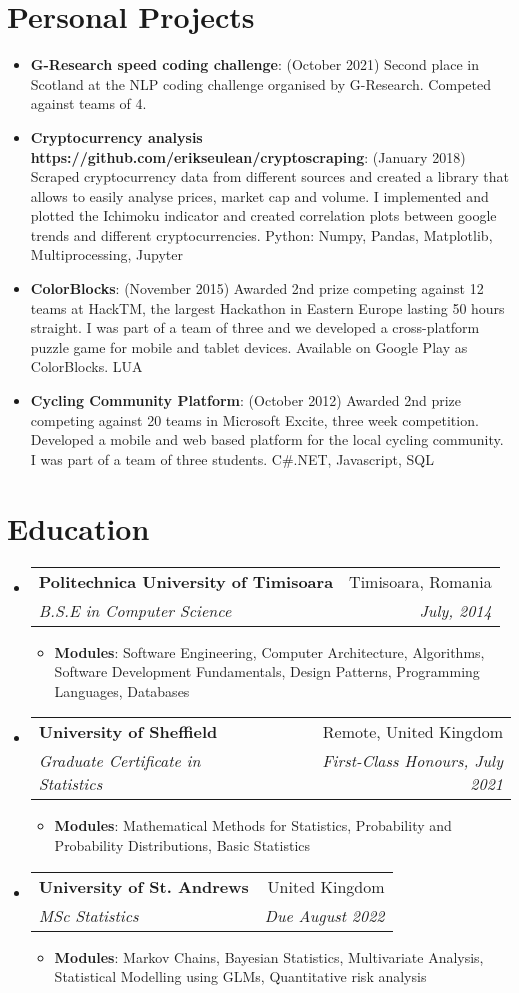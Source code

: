\documentclass[letterpaper,11pt]{article}
\makeatletter
\newcommand{\resumeItem}[2]{
  \item\small{
    \textbf{#1}{: #2 \vspace{-1pt}}
  }
}
\newcommand{\resumeSubheading}[4]{
  \vspace{-1pt}\item
    \begin{tabular*}{0.97\textwidth}{l@{\extracolsep{\fill}}r}
      \textbf{#1} & #2 \\
      \textit{\small#3} & \textit{\small #4} \\
    \end{tabular*}\vspace{-5pt}
}
\newcommand{\resumeSubItem}[2]{\resumeItem{#1}{#2}\vspace{-5pt}}
\newcommand{\resumeSubHeadingListStart}{\begin{itemize}[leftmargin=*]}
\newcommand{\resumeSubHeadingListEnd}{\end{itemize}}
\newcommand{\resumeItemListStart}{\begin{itemize}}
\newcommand{\resumeItemListEnd}{\end{itemize}\vspace{-4.6pt}}
\makeatother
\begin{document}
\section{Personal Projects}
  \resumeSubHeadingListStart
    \resumeSubItem {G-Research speed coding challenge}
    {(October 2021) Second place in Scotland at the NLP coding challenge organised by G-Research. Competed against teams of 4.}
    \resumeSubItem {Cryptocurrency analysis https://github.com/erikseulean/cryptoscraping}
    {(January 2018) Scraped cryptocurrency data from different sources and created a library that allows to easily analyse prices, market cap and volume. I implemented and plotted the Ichimoku indicator and created correlation plots between google trends and different cryptocurrencies. Python: Numpy, Pandas, Matplotlib, Multiprocessing, Jupyter}
    \resumeSubItem{ColorBlocks}
      {(November 2015) Awarded 2nd prize competing against 12 teams at HackTM, the largest Hackathon in Eastern Europe lasting 50 hours straight. I was part of a team of three and we developed a cross-platform puzzle game for mobile and tablet devices. Available on Google Play as ColorBlocks. LUA}
    \resumeSubItem{Cycling Community Platform}
    	{(October 2012) Awarded 2nd prize competing against 20 teams in Microsoft Excite, three week competition. Developed a mobile and web based platform for the local cycling community. I was part of a team of three students. C\#.NET, Javascript, SQL}
  \resumeSubHeadingListEnd


\section{Education}
  \resumeSubHeadingListStart
    \resumeSubheading
      {Politechnica University of Timisoara}{Timisoara, Romania}
      {B.S.E in Computer Science}{July, 2014}
    \resumeItemListStart
    	\resumeItem{Modules}
        {Software Engineering, Computer Architecture, Algorithms, Software Development Fundamentals, Design Patterns, Programming Languages, Databases}
    \resumeItemListEnd
    \resumeSubheading
      {University of Sheffield}{Remote, United Kingdom}
      {Graduate Certificate in Statistics}{First-Class Honours, July 2021}
    \resumeItemListStart
    	\resumeItem{Modules}
        {Mathematical Methods for Statistics, Probability and Probability Distributions, Basic Statistics}
    \resumeItemListEnd
    \resumeSubheading
      {University of St. Andrews}{United Kingdom}
      {MSc Statistics} {Due August 2022}
    \resumeItemListStart
    	\resumeItem{Modules}
        {Markov Chains, Bayesian Statistics, Multivariate Analysis, Statistical Modelling using GLMs, Quantitative risk analysis}
    \resumeItemListEnd        
  \resumeSubHeadingListEnd
\end{document}
